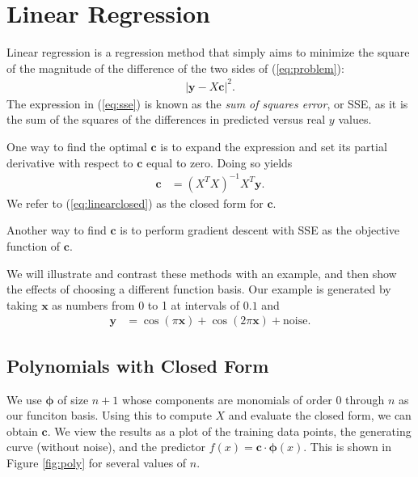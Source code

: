 \documentclass[10pt]{paper}
\begin{document}
\section{Linear Regression}

Linear regression is a regression method that simply aims to minimize the square of the magnitude of the difference of the two sides of (\ref{eq:problem}):
\begin{align}
\left| \bm{y} - X \bm{c} \right|^2. \label{eq:sse}
\end{align}
The expression in (\ref{eq:sse}) is known as the \emph{sum of squares error}, or SSE, as it is the sum of the squares of the differences in predicted versus real $y$ values. 

One way to find the optimal $\bm{c}$ is to expand the expression and set its partial derivative with respect to $\bm{c}$ equal to zero. Doing so yields
\begin{align}
\bm{c} &= \left( X^T X \right)^{-1} X^T \bm{y}. \label{eq:linearclosed}
\end{align}
We refer to (\ref{eq:linearclosed}) as the closed form for $\bm{c}$.

Another way to find $\bm{c}$ is to perform gradient descent with SSE as the objective function of $\bm{c}$.

We will illustrate and contrast these methods with an example, and then show the effects of choosing a different function basis. Our example is generated by taking $\bm{x}$ as numbers from 0 to 1 at intervals of $0.1$ and 
\begin{align*}
\bm{y} &= \cos(\pi \bm{x}) + \cos(2 \pi \bm{x}) + \text{noise}.
\end{align*}

\subsection{Polynomials with Closed Form}

We use $\bm{\phi}$ of size $n+1$ whose components are monomials of order 0 through $n$ as our funciton basis. Using this to compute $X$ and evaluate the closed form, we can obtain $\bm{c}$. We view the results as a plot of the training data points, the generating curve (without noise), and the predictor $f(x) = \bm{c} \cdot \bm{\phi}(x)$. This is shown in Figure \ref{fig:poly} for several values of $n$.
\end{document}
